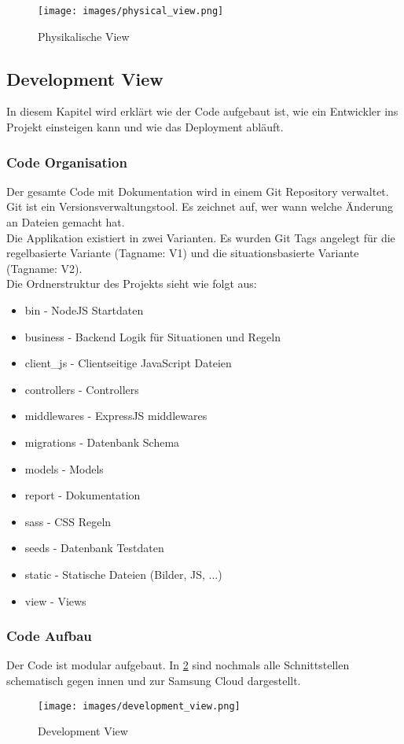 \begin{figure}[ht]
  \begin{center}
    \texttt{[image: images/physical\_view.png]}
    \caption[Physikalische View]{Physikalische View}
    \label{fig:physical_view}
  \end{center}
\end{figure}
\clearpage
%
\subsection{Development View}
In diesem Kapitel wird erklärt wie der Code aufgebaut ist, wie ein Entwickler ins Projekt einsteigen kann und wie das Deployment abläuft.
%
\subsubsection{Code Organisation}
Der gesamte Code mit Dokumentation wird in einem Git Repository verwaltet. Git ist ein Versionsverwaltungstool. Es zeichnet auf, wer wann welche Änderung an Dateien gemacht hat.\\[2ex]
%
Die Applikation existiert in zwei Varianten. Es wurden Git Tags angelegt für die regelbasierte Variante (Tagname: V1) und die situationsbasierte Variante (Tagname: V2).\\
%
Die Ordnerstruktur des Projekts sieht wie folgt aus:
%
\begin{itemize}
\item bin - NodeJS Startdaten
\item business - Backend Logik für Situationen und Regeln
\item client\_js - Clientseitige JavaScript Dateien
\item controllers - Controllers
\item middlewares - ExpressJS middlewares
\item migrations - Datenbank Schema
\item models - Models
\item report - Dokumentation
\item sass - CSS Regeln
\item seeds - Datenbank Testdaten
\item static - Statische Dateien (Bilder, JS, ...)
\item view - Views
\end{itemize}
%
\clearpage
%
\subsubsection{Code Aufbau}
Der Code ist modular aufgebaut. In \ref{fig:development_view} sind nochmals alle Schnittstellen schematisch gegen innen und zur Samsung Cloud dargestellt.\\
%
\begin{figure}[ht]
  \begin{center}
    \texttt{[image: images/development\_view.png]}
    \caption[Development View]{Development View}
    \label{fig:development_view}
  \end{center}
\end{figure}
%
\clearpage
%
